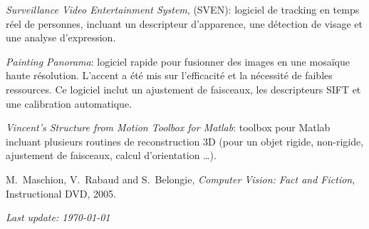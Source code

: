 \documentclass{article}
\begin{document}
\begin{llist}
{{\em Surveillance Video Entertainment System}, (SVEN): logiciel de tracking en temps r\'eel de personnes, incluant un 
descripteur d'apparence, une d\'{e}tection de visage et une analyse d'expression.

{\em Painting Panorama}: logiciel rapide pour fusionner des images en une mosa\"{i}que haute r\'{e}solution.  L'accent 
a \'{e}t\'{e} mis sur l'efficacit\'{e} et la n\'{e}cessit\'{e} de faibles ressources.  Ce logiciel inclut un ajustement 
de faisceaux, les descripteurs SIFT et une calibration automatique.

{\em Vincent's Structure from Motion Toolbox for Matlab}: toolbox pour Matlab incluant plusieurs routines de 
reconstruction 3D (pour un objet rigide, non-rigide, ajustement de faisceaux, calcul d'orientation \dots).
}

{
}
{
}


{
}
{
}


M.~Maschion, V.~Rabaud and S.~Belongie, {\em Computer Vision: Fact and Fiction},
Instructional DVD, 2005.





\end{llist}

{\em Last update: \today}
\end{document}
